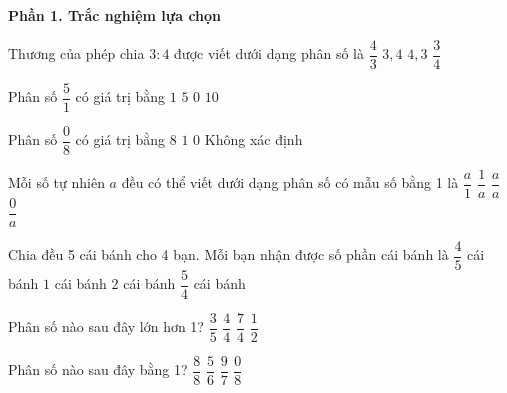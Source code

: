 \textbf{Phần 1. Trắc nghiệm lựa chọn}

\begin{ex} %
Thương của phép chia $3 : 4$ được viết dưới dạng phân số là
\choice
{$\dfrac{4}{3}$}
{$3{,}4$}
{$4{,}3$}
{\True $\dfrac{3}{4}$}
\end{ex}

\begin{ex} %
Phân số $\dfrac{5}{1}$ có giá trị bằng
\choice
{$1$}
{\True $5$}
{$0$}
{$10$}
\end{ex}

\begin{ex} %
Phân số $\dfrac{0}{8}$ có giá trị bằng
\choice
{$8$}
{$1$}
{\True $0$}
{Không xác định}
\end{ex}

\begin{ex} %
Mỗi số tự nhiên $a$ đều có thể viết dưới dạng phân số có mẫu số bằng 1 là
\choice
{\True $\dfrac{a}{1}$}
{$\dfrac{1}{a}$}
{$\dfrac{a}{a}$}
{$\dfrac{0}{a}$}
\end{ex}

\begin{ex} %
Chia đều 5 cái bánh cho 4 bạn. Mỗi bạn nhận được số phần cái bánh là
\choice
{$\dfrac{4}{5}$ cái bánh}
{$1$ cái bánh}
{$2$ cái bánh}
{\True $\dfrac{5}{4}$ cái bánh}
\end{ex}

\begin{ex} %
Phân số nào sau đây lớn hơn 1?
\choice
{$\dfrac{3}{5}$}
{$\dfrac{4}{4}$}
{\True $\dfrac{7}{4}$}
{$\dfrac{1}{2}$}
\end{ex}

\begin{ex} %
Phân số nào sau đây bằng 1?
\choice
{\True $\dfrac{8}{8}$}
{$\dfrac{5}{6}$}
{$\dfrac{9}{7}$}
{$\dfrac{0}{8}$}
\end{ex}

